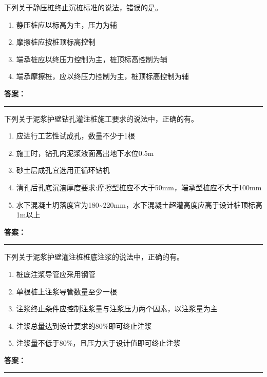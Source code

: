 \documentclass[UTF8,fontset=fandol,11pt]{ctexart}
\newcommand{\answerline}{\textcolor{answerred}{\rule{2.4cm}{0.7pt}}}
\begin{document}
\vspace{0.2em}

\begin{quizbox}[title={第 2 题}]
下列关于静压桩终止沉桩标准的说法，错误的是。\\
\begin{enumerate}[label=\Alph*.]
\item 静压桩应以标高为主，压力为辅
\item 摩擦桩应按桩顶标高控制
\item 端承桩应以终压力控制为主，桩顶标高控制为辅
\item 端承摩擦桩，应以终压力控制为主，桩顶标高控制为辅
\end{enumerate}
\textbf{\textcolor{answerred}{答案：}} \answerline
\end{quizbox}

\vspace{0.2em}

\begin{quizbox}[title={第 3 题}]
下列关于泥浆护壁钻孔灌注桩施工要求的说法中，正确的有。\\
\begin{enumerate}[label=\Alph*.]
\item 应进行工艺性试成孔，数量不少于1根
\item 施工时，钻孔内泥浆液面高出地下水位0.5m
\item 砂土层成孔宜选用正循环钻机
\item 清孔后孔底沉渣厚度要求:摩擦型桩应不大于50mm，端承型桩应不大于100mm
\item 水下混凝土坍落度宜为180\textasciitilde{}220mm，水下混凝土超灌高度应高于设计桩顶标高1m以上
\end{enumerate}
\textbf{\textcolor{answerred}{答案：}} \answerline
\end{quizbox}

\vspace{0.2em}

\begin{quizbox}[title={第 4 题}]
下列关于泥浆护壁灌注桩桩底注浆的说法中，正确的有。\\
\begin{enumerate}[label=\Alph*.]
\item 桩底注浆导管应采用钢管
\item 单根桩上注浆导管数量至少一根
\item 注浆终止条件应控制注浆量与注浆压力两个因素，以注浆量为主
\item 注浆总量达到设计要求的80\%即可终止注浆
\item 注浆量不低于80\%，且压力大于设计值即可终止注浆
\end{enumerate}
\textbf{\textcolor{answerred}{答案：}} \answerline
\end{quizbox}
\end{document}
